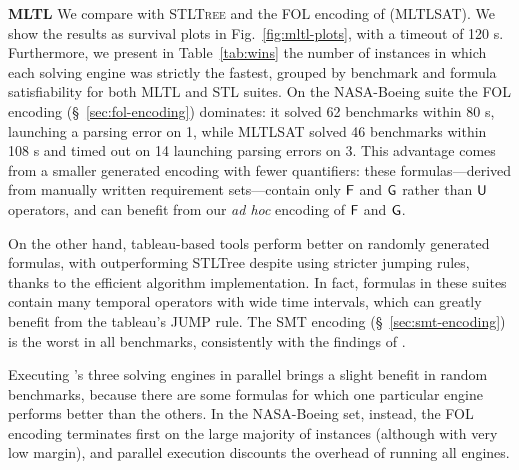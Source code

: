 \documentclass{easychair}
\begin{document}
\noindent \textbf{MLTL} We compare \stlsat{} with \textsc{STLTree} and the FOL encoding of \cite{LiVR22} (MLTLSAT). We show the results as survival plots in Fig.~\ref{fig:mltl-plots}, with a timeout of 120 s. Furthermore, we present in Table~\ref{tab:wins} the number of instances in which each \stlsat{} solving engine was strictly the fastest, grouped by benchmark and formula satisfiability for both MLTL and STL suites.
%
On the NASA-Boeing suite the FOL encoding (\S~\ref{sec:fol-encoding}) dominates: it solved 62 benchmarks within 80 s, launching a parsing error on 1, while MLTLSAT solved 46 benchmarks within 108 s and timed out on 14 launching parsing errors on 3.
This advantage comes from a smaller generated encoding with fewer quantifiers: these formulas---derived from manually written requirement sets---contain only $\mathsf{F}{}$ and $\mathsf{G}{}$ rather than $\mathsf{U}{}$ operators, and can benefit from our \emph{ad hoc} encoding of $\mathsf{F}{}$ and $\mathsf{G}{}$.

On the other hand, tableau-based tools perform better on randomly generated formulas, with \stlsat{} outperforming STLTree despite using stricter jumping rules, thanks to the efficient algorithm implementation.
%
In fact, formulas in these suites contain many temporal operators with wide time intervals, which can greatly benefit from the tableau's \textsf{JUMP} rule.
%
The SMT encoding (\S~\ref{sec:smt-encoding}) is the worst in all benchmarks, consistently with the findings of \cite{MelaniBC25}.

Executing \stlsat{}'s three solving engines in parallel brings a slight benefit in random benchmarks, because there are some formulas for which one particular engine performs better than the others.
%
In the NASA-Boeing set, instead, the FOL encoding terminates first on the large majority of instances (although with very low margin), and parallel execution discounts the overhead of running all engines.
\end{document}
